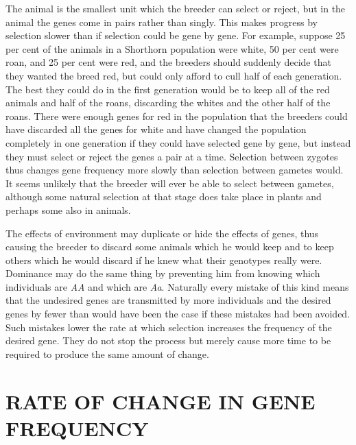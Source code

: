 The animal is the smallest unit which the breeder can select or
reject, but in the animal the genes come in pairs rather than singly.
This makes progress by selection slower than if selection could be gene
by gene. For example, suppose 25 per cent of the animals in a Shorthorn
population were white, 50 per cent were roan, and 25 per cent
were red, and the breeders should suddenly decide that they wanted the
breed red, but could only afford to cull half of each generation. The
best they could do in the first generation would be to keep all of the
red animals and half of the roans, discarding the whites and the other
half of the roans. There were enough genes for red in the population
that the breeders could have discarded all the genes for white and have
changed the population completely in one generation if they could
have selected gene by gene, but instead they must select or reject the
genes a pair at a time. Selection between zygotes thus changes gene
frequency more slowly than selection between gametes would. It seems
unlikely that the breeder will ever be able to select between gametes,
although some natural selection at that stage does take place in plants
and perhaps some also in animals.

The effects of environment may duplicate or hide the effects of
genes, thus causing the breeder to discard some animals which he would
keep and to keep others which he would discard if he knew what their
genotypes really were. Dominance may do the same thing by preventing
him from knowing which individuals are \textit{AA} and which are \textit{Aa}.
Naturally every mistake of this kind means that the undesired genes are
transmitted by more individuals and the desired genes by fewer than
would have been the case if these mistakes had been avoided. Such mistakes
lower the rate at which selection increases the frequency of the
desired gene. They do not stop the process but merely cause more time
to be required to produce the same amount of change.

\section*{RATE OF CHANGE IN GENE FREQUENCY}

